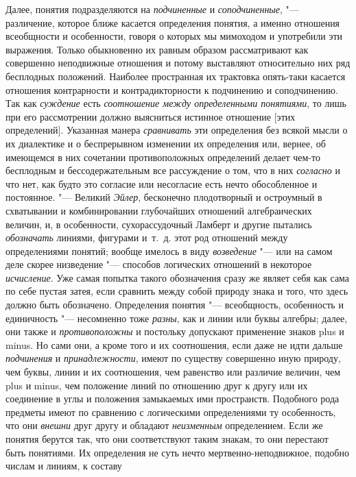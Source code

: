 Далее, понятия подразделяются на {\em подчиненные} и {\em соподчиненные}, "---
различение, которое ближе касается определения понятия, а именно отношения
всеобщности и особенности, говоря о которых мы мимоходом и употребили эти
выражения.
Только обыкновенно их равным образом
рассматривают как совершенно неподвижные отношения и потому выставляют
относительно них ряд бесплодных положений. Наиболее пространная их
трактовка опять-таки касается отношения контрарности и контрадикторности к
подчинению и соподчинению. Так как {\em суждение} есть {\em соотношение между
определенными понятиями}, то лишь при его рассмотрении должно выясниться
истинное отношение [этих определений]. Указанная манера {\em сравнивать} эти
определения без всякой мысли о их диалектике и о беспрерывном изменении их
определения или, вернее, об имеющемся в них сочетании противоположных
определений делает чем-то бесплодным и бессодержательным все рассуждение о
том, что в них {\em согласно} и что нет, как будто это согласие или несогласие
есть нечто обособленное и постоянное. "--- Великий {\em Эйлер}, бесконечно
плодотворный и остроумный в схватывании и комбинировании глубочайших
отношений алгебраических величин, и, в особенности, сухорассудочный Ламберт
и другие пытались {\em обозначать} линиями, фигурами и~т.~д. этот род отношений
между определениями понятий; вообще имелось в виду {\em возведение} "--- или на
самом деле скорее низведение "--- способов логических отношений в некоторое
{\em исчисление}. Уже самая попытка такого обозначения сразу же являет себя
как сама по себе пустая затея, если сравнить между собой природу знака и того,
что здесь должно быть обозначено. Определения понятия "--- всеобщность,
особенность и единичность "--- несомненно тоже {\em разны}, как и линии или
буквы алгебры; далее, они также и {\em противоположны} и постольку допускают
применение знаков plus и minus. Но сами они, а кроме того и их соотношения,
если даже не идти дальше {\em подчинения} и {\em принадлежности}, имеют по
существу совершенно иную природу, чем буквы, линии и их соотношения, чем
равенство или различие величин, чем plus и minus, чем положение линий по
отношению друг к другу или их соединение в углы и положения замыкаемых ими
пространств. Подобного рода предметы имеют по сравнению с логическими
определениями ту особенность, что они {\em внешни} друг другу и обладают {\em
неизменным} определением. Если же понятия берутся так, что они
соответствуют таким знакам, то они перестают быть понятиями. Их определения
не суть нечто мертвенно-неподвижное, подобно числам и линиям, к составу
